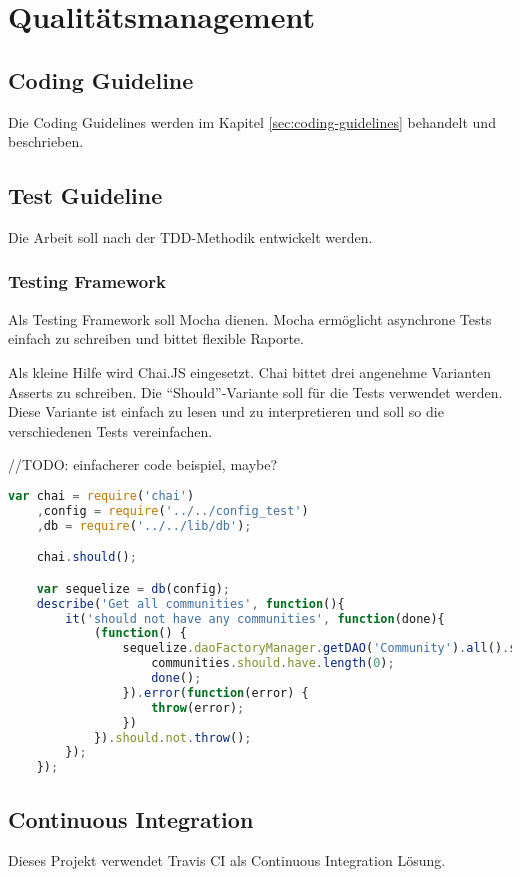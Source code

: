 \chapter{Qualitätsmanagement}


\section{Coding Guideline}
Die Coding Guidelines werden im Kapitel \ref{sec:coding-guidelines}  behandelt und beschrieben.


\section{Test Guideline}
Die Arbeit soll nach der \gls{TDD}-Methodik entwickelt werden.

\subsection*{Testing Framework}
Als Testing Framework soll Mocha \cite{Mocha} dienen. Mocha ermöglicht asynchrone Tests einfach zu schreiben und bittet flexible Raporte.
\newline

Als kleine Hilfe wird Chai.JS \cite{ChaiJS} eingesetzt. Chai bittet drei angenehme Varianten Asserts zu schreiben. Die ``Should''-Variante soll für die Tests verwendet werden. Diese Variante ist einfach zu lesen und zu interpretieren und soll so die verschiedenen Tests vereinfachen. \newline

//TODO: einfacherer code beispiel, maybe?
\begin{lstlisting}[language=JavaScript, caption=Zusammenspiel aus Mocha und Chai.js Should]
var chai = require('chai')
	,config = require('../../config_test')
	,db = require('../../lib/db');

	chai.should();

	var sequelize = db(config);
	describe('Get all communities', function(){
		it('should not have any communities', function(done){
			(function() {
				sequelize.daoFactoryManager.getDAO('Community').all().success(function(communities) {
					communities.should.have.length(0);
					done();
				}).error(function(error) {
					throw(error);
				})
			}).should.not.throw();
		});
	});
\end{lstlisting}


\section{Continuous Integration}
Dieses Projekt verwendet Travis CI als Continuous Integration Lösung.


